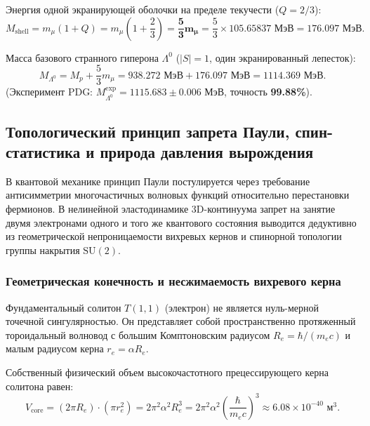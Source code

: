 \documentclass[12pt,a4paper]{article}
\begin{document}
	Энергия одной экранирующей оболочки на пределе текучести ($Q = 2/3$):
	\begin{equation}
		M_{\text{shell}} = m_\mu (1 + Q) = m_\mu \left(1 + \frac{2}{3}\right) = \mathbf{\frac{5}{3} m_\mu} = \frac{5}{3} \times 105.65837 \text{ МэВ} = \mathbf{176.097 \text{ МэВ}}.
	\end{equation}
	
	Масса базового странного гиперона $\Lambda^0$ ($|S|=1$, один экранированный лепесток):
	\begin{equation}
		M_{\Lambda^0} = M_p + \frac{5}{3} m_\mu = 938.272 \text{ МэВ} + 176.097 \text{ МэВ} = \mathbf{1114.369 \text{ МэВ}}.
	\end{equation}
	(Эксперимент PDG: $M_{\Lambda^0}^{\text{exp}} = \mathbf{1115.683 \pm 0.006 \text{ МэВ}}$, точность \textbf{99.88\%}).
	
	\subsection{Топологический принцип запрета Паули, спин-статистика и природа давления вырождения}
	
	В квантовой механике принцип Паули постулируется через требование антисимметрии многочастичных волновых функций относительно перестановки фермионов. В нелинейной эластодинамике 3D-континуума запрет на занятие двумя электронами одного и того же квантового состояния выводится дедуктивно из геометрической непроницаемости вихревых кернов и спинорной топологии группы накрытия $\mathrm{SU}(2)$.
	
	\subsubsection{Геометрическая конечность и несжимаемость вихревого керна}
	Фундаментальный солитон $T(1,1)$ (электрон) не является нуль-мерной точечной сингулярностью. Он представляет собой пространственно протяженный тороидальный волновод с большим Комптоновским радиусом $R_e = \hbar / (m_e c)$ и малым радиусом керна $r_e = \alpha R_e$.
	
	Собственный физический объем высокочастотного прецессирующего керна солитона равен:
	\begin{equation}
		V_{\text{core}} = (2\pi R_e) \cdot (\pi r_e^2) = 2\pi^2 \alpha^2 R_e^3 = 2\pi^2 \alpha^2 \left( \frac{\hbar}{m_e c} \right)^3 \approx 6.08 \times 10^{-40} \text{ м}^3.
	\end{equation}
	
\end{document}
